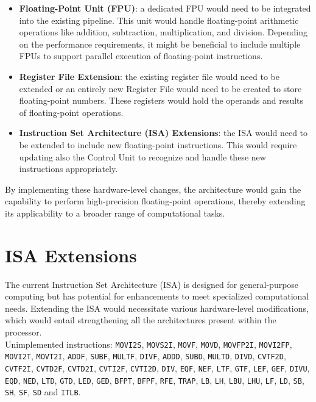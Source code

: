 \begin{itemize}
    \item \textbf{Floating-Point Unit (FPU)}: a dedicated FPU would need to be integrated into the existing pipeline. This unit would handle floating-point arithmetic operations like addition, subtraction, multiplication, and division. Depending on the performance requirements, it might be beneficial to include multiple FPUs to support parallel execution of floating-point instructions.
    
    \item \textbf{Register File Extension}: the existing register file would need to be extended or an entirely new Register File would need to be created to store floating-point numbers. These registers would hold the operands and results of floating-point operations.
    
    \item \textbf{Instruction Set Architecture (ISA) Extensions}: the ISA would need to be extended to include new floating-point instructions. This would require updating also the Control Unit to recognize and handle these new instructions appropriately.
\end{itemize}

By implementing these hardware-level changes, the architecture would gain the capability to perform high-precision floating-point operations, thereby extending its applicability to a broader range of computational tasks.

\section{ISA Extensions}
The current Instruction Set Architecture (ISA) is designed for general-purpose computing but has potential for enhancements to meet specialized computational needs. Extending the ISA would necessitate various hardware-level modifications, which would entail strengthening all the architectures present within the processor. \\

Unimplemented instructions:  \texttt{MOVI2S}, \texttt{MOVS2I}, \texttt{MOVF}, \texttt{MOVD}, \texttt{MOVFP2I}, \texttt{MOVI2FP}, \texttt{MOVI2T}, \texttt{MOVT2I}, \texttt{ADDF}, \texttt{SUBF}, \texttt{MULTF}, \texttt{DIVF}, \texttt{ADDD}, \texttt{SUBD}, \texttt{MULTD}, \texttt{DIVD}, \texttt{CVTF2D}, \texttt{CVTF2I}, \texttt{CVTD2F}, \texttt{CVTD2I}, \texttt{CVTI2F}, \texttt{CVTI2D}, \texttt{DIV}, \texttt{EQF}, \texttt{NEF}, \texttt{LTF}, \texttt{GTF}, \texttt{LEF}, \texttt{GEF}, \texttt{DIVU}, \texttt{EQD}, \texttt{NED}, \texttt{LTD}, \texttt{GTD}, \texttt{LED}, \texttt{GED}, \texttt{BFPT}, \texttt{BFPF}, \texttt{RFE}, \texttt{TRAP}, \texttt{LB}, \texttt{LH}, \texttt{LBU}, \texttt{LHU}, \texttt{LF}, \texttt{LD}, \texttt{SB}, \texttt{SH}, \texttt{SF}, \texttt{SD} and \texttt{ITLB}.


